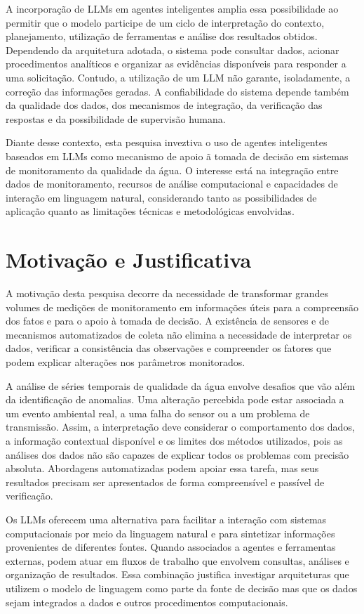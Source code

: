 A incorporação de LLMs em agentes inteligentes amplia essa possibilidade ao permitir que o modelo participe de um ciclo de interpretação do contexto, planejamento, utilização de ferramentas e análise dos resultados obtidos. Dependendo da arquitetura adotada, o sistema pode consultar dados, acionar procedimentos analíticos e organizar as evidências disponíveis para responder a uma solicitação. Contudo, a utilização de um LLM não garante, isoladamente, a correção das informações geradas. A confiabilidade do sistema depende também da qualidade dos dados, dos mecanismos de integração, da verificação das respostas e da possibilidade de supervisão humana.

Diante desse contexto, esta pesquisa inveztiva o uso de agentes inteligentes baseados em LLMs como mecanismo de apoio ã tomada de decisão em sistemas de monitoramento da qualidade da água. O interesse está na integração entre dados de monitoramento, recursos de análise computacional e capacidades de interação em linguagem natural, considerando tanto as possibilidades de aplicação quanto as limitações técnicas e metodológicas envolvidas.

\section{Motivação e Justificativa}
\label{sec:justificativa}

A motivação desta pesquisa decorre da necessidade de transformar grandes volumes de medições de monitoramento em informações úteis para a compreensão dos fatos e para o apoio à tomada de decisão. A existência de sensores e de mecanismos automatizados de coleta não elimina a necessidade de interpretar os dados, verificar a consistência das observações e compreender os fatores que podem explicar alterações nos parâmetros monitorados.

A análise de séries temporais de qualidade da água envolve desafios que vão além da identificação de anomalias. Uma alteração percebida pode estar associada a um evento ambiental real, a uma falha do sensor ou a um problema de transmissão. Assim, a interpretação deve considerar o comportamento dos dados, a informação contextual disponível e os limites dos métodos utilizados, pois as análises dos dados não são capazes de explicar todos os problemas com precisão absoluta. Abordagens automatizadas podem apoiar essa tarefa, mas seus resultados precisam ser apresentados de forma compreensível e passível de verificação.

Os LLMs oferecem uma alternativa para facilitar a interação com sistemas computacionais por meio da linguagem natural e para sintetizar informações provenientes de diferentes fontes. Quando associados a agentes e ferramentas externas, podem atuar em fluxos de trabalho que envolvem consultas, análises e organização de resultados. Essa combinação justifica investigar arquiteturas que utilizem o modelo de linguagem como parte da fonte de decisão mas que os dados sejam integrados a dados e outros procedimentos computacionais.


